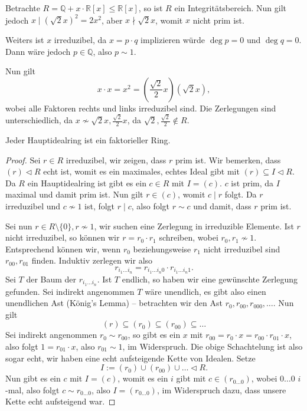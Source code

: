 \begin{example}
    Betrachte $R = \mathbb{Q} + x \cdot \mathbb{R}[x] \leq \mathbb{R}[x]$, so ist $R$ ein Integritätsbereich. Nun gilt jedoch $x \mid (\sqrt{2} x)^2 = 2x^2$, aber $x \nmid \sqrt{2}x$, womit $x$ nicht prim ist.
    
    Weiters ist $x$ irreduzibel, da $x = p \cdot q$ implizieren würde $\deg{p} = 0$ und $\deg{q} = 0$. Dann wäre jedoch $p \in \mathbb{Q}$, also $p \sim 1$.
    
    Nun gilt
    $$ x \cdot x = x^2 = \left(\frac{\sqrt{2}}{2} x\right)(\sqrt{2}x), $$
    wobei alle Faktoren rechts und links irreduzibel sind. Die Zerlegungen sind unterschiedlich, da $x \not\sim \sqrt{2} x, \frac{\sqrt{2}}{2} x$, da $\sqrt{2}, \frac{\sqrt{2}}{2} \notin R$.
\end{example}

\begin{proposition}
    Jeder Hauptidealring ist ein faktorieller Ring.
\end{proposition}

\begin{proof}
    Sei $r \in R$ irreduzibel, wir zeigen, dass $r$ prim ist. Wir bemerken, dass $ (r) \vartriangleleft R $ echt ist, womit es ein maximales, echtes Ideal gibt mit $(r) \subseteq I \vartriangleleft R$. Da $R$ ein Hauptidealring ist gibt es ein $c \in R$ mit $I = (c)$. $c$ ist prim, da $I$ maximal und damit prim ist. Nun gilt $r \in (c)$, womit $c \mid r$ folgt. Da $r$ irreduzibel und $c\not\sim 1$ ist, folgt $r \mid c$, also folgt $r \sim c$ und damit, dass $r$ prim ist.

    Sei nun $r \in R \setminus \{0\}, r \not\sim 1$, wir suchen eine Zerlegung in irreduzible Elemente. Ist $r$ nicht irreduzibel, so können wir $r = r_0 \cdot r_1$ schreiben, wobei $r_0, r_1 \not\sim 1$. Entsprechend können wir, wenn $r_0$ beziehungsweise $r_1$ nicht irreduzibel sind $r_{00}, r_{01}$ finden. Induktiv zerlegen wir also
    $$ r_{i_1 \hdots i_n} = r_{i_1 \hdots i_n 0} \cdot r_{i_1 \hdots i_n 1}. $$
    Sei $T$ der Baum der $r_{i_1 \hdots i_n}$. Ist $T$ endlich, so haben wir eine gewünschte Zerlegung gefunden. Sei indirekt angenommen $T$ wäre unendlich, es gibt also einen unendlichen Ast (König's Lemma) -- \obda betrachten wir den Ast $r_0, r_{00}, r_{000}, \hdots$. Nun gilt
    $$ (r) \subseteq (r_0) \subseteq (r_{00}) \subseteq \hdots $$
    Sei indirekt angenommen $r_0 \sim r_{00}$, so gibt es ein $x$ mit $r_{00} = r_0 \cdot x = r_{00} \cdot r_{01} \cdot x$, also folgt $ 1 = r_{01} \cdot x$, also $r_{01} \sim 1$, im Widerspruch. Die obige Schachtelung ist also sogar echt, wir haben eine echt aufsteigende Kette von Idealen. Setze
    $$ I := (r_0) \cup (r_{00}) \cup \hdots \vartriangleleft R. $$
    Nun gibt es ein $c$ mit $I = (c)$, womit es ein $i$ gibt mit $c \in (r_{0 \hdots 0})$, wobei $0 \hdots 0$ $i$-mal, also folgt $c \sim r_{0 \hdots 0}$, also $I = (r_{0 \hdots 0})$, im Widerspruch dazu, dass unsere Kette echt aufsteigend war.
\end{proof}

